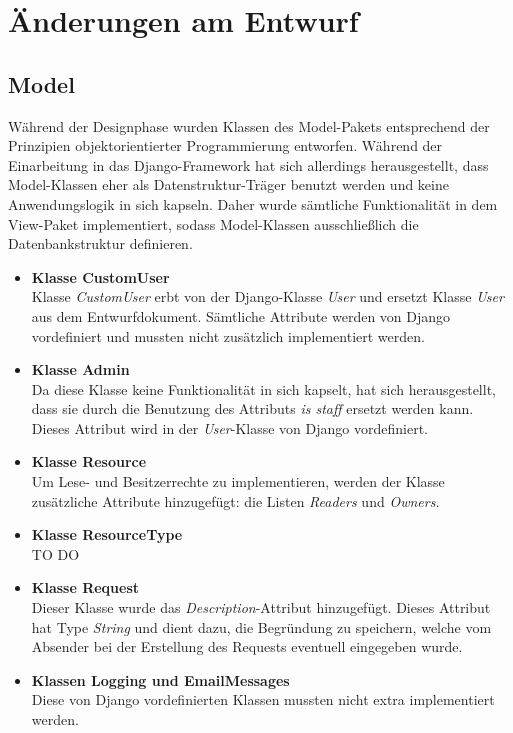 \documentclass[parskip=full,11pt]{scrartcl}
\begin{document}
 \newpage
 \section{Änderungen am Entwurf}
 
 \subsection{Model}
Während der Designphase wurden Klassen des Model-Pakets entsprechend der Prinzipien objektorientierter Programmierung entworfen. Während der Einarbeitung in das Django-Framework hat sich allerdings herausgestellt, dass Model-Klassen eher als Datenstruktur-Träger benutzt werden und keine Anwendungslogik in sich kapseln. Daher wurde sämtliche Funktionalität in dem View-Paket implementiert, sodass Model-Klassen ausschließlich die Datenbankstruktur definieren.
 
\begin{itemize}
\item \textbf{Klasse CustomUser}\\
Klasse \textit{CustomUser} erbt von der Django-Klasse \textit{User} und ersetzt Klasse \textit{User} aus dem Entwurfdokument. Sämtliche Attribute werden von Django vordefiniert und mussten nicht zusätzlich implementiert werden.

\item \textbf{Klasse Admin}\\
Da diese Klasse keine Funktionalität in sich kapselt, hat sich herausgestellt, dass sie durch die Benutzung des Attributs \textit{is staff} ersetzt werden kann. Dieses Attribut wird in der \textit{User}-Klasse von Django vordefiniert.
 
\item\textbf{Klasse Resource}\\
Um Lese- und Besitzerrechte zu implementieren, werden der Klasse zusätzliche Attribute hinzugefügt: die Listen \textit{Readers} und \textit{Owners}.

\item \textbf{Klasse ResourceType}\\
TO DO

\item \textbf{Klasse Request}\\
Dieser Klasse wurde das \textit{Description}-Attribut hinzugefügt. Dieses Attribut hat Type \textit{String} und dient dazu, die Begründung zu speichern, welche vom Absender bei der Erstellung des Requests eventuell eingegeben wurde.

\item \textbf{Klassen Logging und EmailMessages}\\
Diese von Django vordefinierten Klassen mussten nicht extra implementiert werden. 
\end{itemize}
\end{document}
